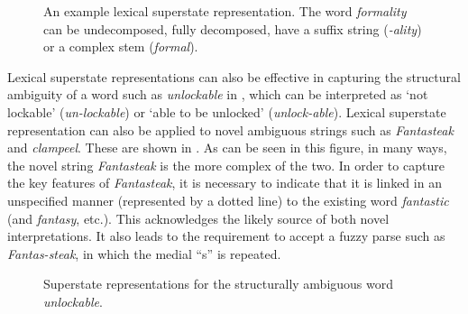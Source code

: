 \documentclass[output=paper]{langsci/langscibook}
\begin{document}
\begin{figure}
\caption{\label{fig:libben:1}An example lexical superstate representation. The word \textit{formality} can be undecomposed, fully decomposed, have a suffix string (\textit{-ality}) or a complex stem (\textit{formal}).}
\end{figure}

Lexical superstate representations can also be effective in capturing the structural ambiguity of a word such as \textit{unlockable} in , which can be interpreted as `not lockable' (\textit{un-lockable}) or `able to be unlocked' (\textit{unlock-able}). Lexical superstate representation can also be applied to novel ambiguous strings such as \textit{Fantasteak} and \textit{clampeel}. These are shown in . As can be seen in this figure, in many ways, the novel string \textit{Fantasteak} is the more complex of the two. In order to capture the key features of \textit{Fantasteak}, it is necessary to indicate that it is linked in an unspecified manner (represented by a dotted line) to the existing word \textit{fantastic} (and \textit{fantasy}, etc.). This acknowledges the likely source of both novel interpretations. It also leads to the requirement to accept a fuzzy parse such as \textit{Fantas-steak}, in which the medial “s” is repeated. 


\begin{figure}
\caption{\label{fig:libben:2}Superstate representations for the structurally ambiguous word \textit{unlockable}.}
\end{figure}
\end{document}
